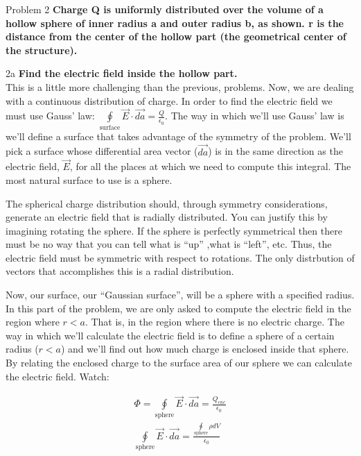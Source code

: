 \begin{homeworkProblem}{Problem 2}
    \textbf{Charge Q is uniformly distributed over the volume of a
    hollow sphere of inner radius a and outer radius b, as shown. r is
    the distance from the center of the hollow part (the geometrical
    center of the structure).}
    \begin{homeworkSection}{2a}
        \textbf{Find the electric field inside the hollow part.}
        \\

        This is a little more challenging than the previous, problems.
        Now, we are dealing with a continuous distribution of charge. In
        order to find the electric field we must use Gauss' law:
        $\oint\limits_{\text{surface}}
        \vec{E}\cdot\vec{da} = \frac{Q}{\epsilon_0}$. The way in which
        we'll use Gauss' law is we'll define a surface that takes
        advantage of the symmetry of the problem. We'll pick a surface
        whose differential area vector ($\vec{da}$) is in the same
        direction as the electric field, $\vec{E}$, for all the places
        at which we need to compute this integral. The most natural
        surface to use is a sphere.
        
        The spherical charge distribution should, through symmetry
        considerations, generate an electric field that is radially
        distributed. You can justify this by imagining rotating the
        sphere. If the sphere is perfectly symmetrical then there must
        be no way that you can tell what is ``up'' ,what is ``left'',
        etc. Thus, the electric field must be symmetric with respect to
        rotations. The only distrbution of vectors that accomplishes
        this is a radial distribution.
        
        Now, our surface, our ``Gaussian surface'', will be a sphere
        with a specified radius. In this part of the problem, we are
        only asked to compute the electric field in the region where
        $r<a$. That is, in the region where there is no electric charge.
        The way in which we'll calculate the electric field is to define
        a sphere of a certain radius ($r<a$) and we'll find out how much
        charge is enclosed inside that sphere. By relating the enclosed
        charge to the surface area of our sphere we can calculate the
        electric field. Watch:

        \begin{align}
            \label{}
            \Phi = \oint\limits_{\text{sphere}} \vec{E}\cdot\vec{da} =
            \frac{Q_{enc}}{\epsilon_0} \nonumber \\
            \oint\limits_{\text{sphere}} \vec{E}\cdot\vec{da} =
            \frac{\oint\limits_{\text{sphere}}\rho dV}{\epsilon_0}
        \end{align}


\end{homeworkSection}
\end{homeworkProblem}
